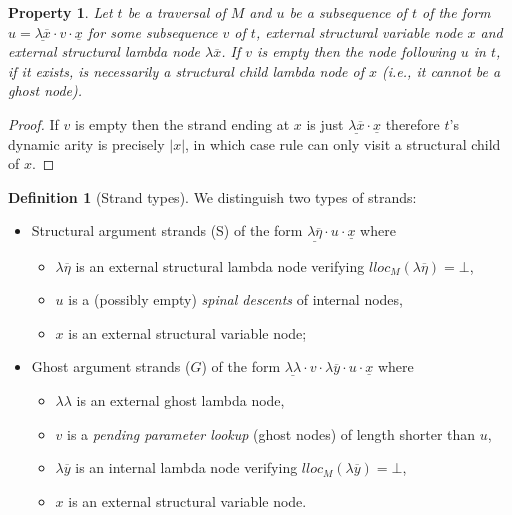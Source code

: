 \documentclass{elsarticle}
\makeatletter
\theoremstyle{plain}
\newtheorem{property}[theorem]{Property}
\theoremstyle{definition}
\newtheorem{definition}{Definition}[section]
\newcommand{\ghostlmd}{{\lambda\!\!\lambda}}
\renewcommand\ie{{\it i.e.\@\xspace}}
\makeatother
\begin{document}
\begin{property}
\label{prop:strand_spinaldescent}
Let $t$ be a traversal of $M$ and $u$ be a subsequence of $t$ of the form
$u = \underline{\lambda \overline{x}} \cdot v \cdot \underline{x}$
for some subsequence $v$ of $t$, external structural variable node $x$ and external structural lambda node $\lambda \overline{x}$.
If $v$ is empty then the node following $u$ in $t$, if it exists, is necessarily a structural child lambda node of $x$ (\ie, it cannot be a ghost node).
\end{property}
\begin{proof}
 If $v$ is empty then the strand ending at $x$
 is just $\underline{\lambda \overline{x}} \cdot \underline{x}$ therefore
 $t$'s dynamic arity is precisely $|x|$, in which case rule  can only visit a structural child of $x$.
\end{proof}

\begin{definition}[Strand types]
    \label{def:strandtypes} We distinguish two types of strands:
    \begin{itemize}[nosep]
        \item Structural argument strands (S) of the form $\underline{\lambda\overline{\eta}} \cdot u \cdot \underline{x}$
            where
            \begin{itemize}[nosep]
            \item $\lambda\overline{\eta}$ is an external structural lambda node verifying $lloc_M(\lambda\overline\eta) = \bot$,
            \item $u$ is a (possibly empty) \emph{spinal descents} of internal nodes,
            \item $x$ is an external structural variable node;
            \end{itemize}

        \item Ghost argument strands ($G$) of the form $\underline{\ghostlmd} \cdot  v \cdot \lambda\overline{y} \cdot u \cdot \underline{x}$
        where
        \begin{itemize}[nosep]
            \item $\ghostlmd$ is an external ghost lambda node,
            \item $v$ is a \emph{pending parameter lookup} (ghost nodes) of length shorter than $u$,
            \item $\lambda\overline{y}$ is an internal lambda node verifying $lloc_M(\lambda\overline{y}) = \bot$,
            \item $x$ is an external structural variable node.
        \end{itemize}
    \end{itemize}
\end{definition}
\end{document}
